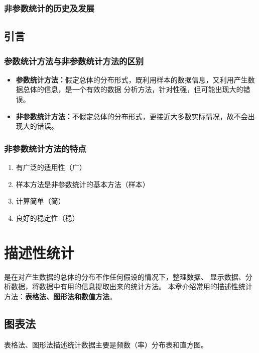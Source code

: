 \documentclass[lang=cn,10pt]{elegantbook}
\begin{document}
\subsection{非参数统计的历史及发展}

\section{引言}
\subsection{参数统计方法与非参数统计方法的区别}
\begin{itemize}
    \item \textbf{参数统计方法：}假定总体的分布形式，既利用样本的数据信息，又利用产生数据总体的信息，是一个有效的数据
          分析方法，针对性强，但可能出现大的错误。
    \item \textbf{非参数统计方法：}不假定总体的分布形式，更接近大多数实际情况，故不会出现大的错误。
\end{itemize}

\subsection{非参数统计方法的特点}

\begin{enumerate}[(1)]
    \item 有广泛的适用性（广）
    \item 样本方法是非参数统计的基本方法（样本）
    \item 计算简单（简）
    \item 良好的稳定性（稳）
\end{enumerate}

\chapter{描述性统计}
\begin{definition}[描述性统计]
    是在对产生数据的总体的分布不作任何假设的情况下，整理数据、
    显示数据、分析数据，将数据中有用的信息提取出来的统计方法。
    本章介绍常用的描述性统计方法：\textbf{表格法、图形法和数值方法}。
\end{definition}

\section{图表法}
表格法、图形法描述统计数据主要是频数（率）分布表和直方图。
\end{document}
